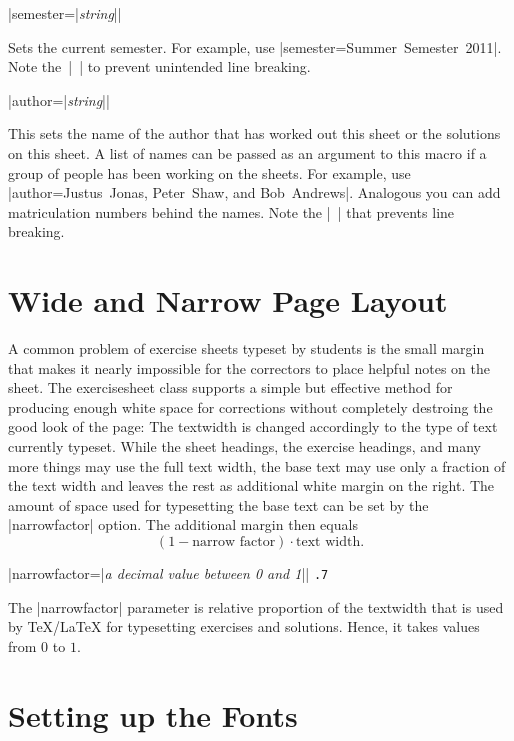 \documentclass[a4paper,fleqn]{report}
\def\exercisesheet{{exercisesheet}}
\def\syntaxdefaultarg#1{\hfill\texttt{\small #1}\par\smallskip\noindent\ignorespaces}
\def\metaargument#1{\textit{\small #1}}
\begin{document}
\begin{syntax}
  |semester={|\metaargument{string}|}| \syntaxdefaultarg{}
  Sets the current semester. For example, use 
  |semester={Summer~Semester~2011}|. Note the~|~| to prevent
  unintended line breaking.
\end{syntax}

\begin{syntax}
  |author={|\metaargument{string}|}| \syntaxdefaultarg{}
  This sets the name of the author that has worked out this sheet or
  the solutions on this sheet. A list of names can be passed as an
  argument to this macro if a group of people has been working on the
  sheets. For example, use 
  |author={Justus~Jonas, Peter~Shaw, and Bob~Andrews}|. 
  Analogous you can add matriculation numbers behind
  the names. Note the |~| that prevents line breaking.
\end{syntax}


\section{Wide and Narrow Page Layout}

A common problem of exercise sheets typeset by students is the small
margin that makes it nearly impossible for the correctors to place
helpful notes on the sheet. The \exercisesheet{} class supports a
simple but effective method for producing enough white space for
corrections without completely destroing the good look of the page:
The textwidth is changed accordingly to the type of text currently
typeset. While the sheet headings, the exercise headings, and many
more things may use the full text width, the base text may use only a
fraction of the text width and leaves the rest as additional white
margin on the right. The amount of space used for typesetting the base
text can be set by the |narrowfactor| option. The additional margin
then equals
\begin{equation*}
  (1 - \text{narrow factor}) \cdot \text{text width}.
\end{equation*}

\begin{syntax}
  |narrowfactor={|\metaargument{a decimal value between 0 and 1}|}| 
  \syntaxdefaultarg{.7}
  The |narrowfactor| parameter is relative proportion of the
  textwidth that is used by \TeX{}/\LaTeX{} for typesetting exercises
  and solutions. Hence, it takes values from $0$ to $1$.
\end{syntax}


\section{Setting up the Fonts}
\end{document}
